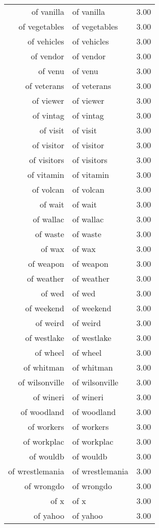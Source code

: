 \begin{table}[ht]
\begin{tabular}{rlr}
  of vanilla & of vanilla & 3.00 \\ 
  of vegetables & of vegetables & 3.00 \\ 
  of vehicles & of vehicles & 3.00 \\ 
  of vendor & of vendor & 3.00 \\ 
  of venu & of venu & 3.00 \\ 
  of veterans & of veterans & 3.00 \\ 
  of viewer & of viewer & 3.00 \\ 
  of vintag & of vintag & 3.00 \\ 
  of visit & of visit & 3.00 \\ 
  of visitor & of visitor & 3.00 \\ 
  of visitors & of visitors & 3.00 \\ 
  of vitamin & of vitamin & 3.00 \\ 
  of volcan & of volcan & 3.00 \\ 
  of wait & of wait & 3.00 \\ 
  of wallac & of wallac & 3.00 \\ 
  of waste & of waste & 3.00 \\ 
  of wax & of wax & 3.00 \\ 
  of weapon & of weapon & 3.00 \\ 
  of weather & of weather & 3.00 \\ 
  of wed & of wed & 3.00 \\ 
  of weekend & of weekend & 3.00 \\ 
  of weird & of weird & 3.00 \\ 
  of westlake & of westlake & 3.00 \\ 
  of wheel & of wheel & 3.00 \\ 
  of whitman & of whitman & 3.00 \\ 
  of wilsonville & of wilsonville & 3.00 \\ 
  of wineri & of wineri & 3.00 \\ 
  of woodland & of woodland & 3.00 \\ 
  of workers & of workers & 3.00 \\ 
  of workplac & of workplac & 3.00 \\ 
  of wouldb & of wouldb & 3.00 \\ 
  of wrestlemania & of wrestlemania & 3.00 \\ 
  of wrongdo & of wrongdo & 3.00 \\ 
  of x & of x & 3.00 \\ 
  of yahoo & of yahoo & 3.00 \\ 

\end{tabular}
\end{table}
